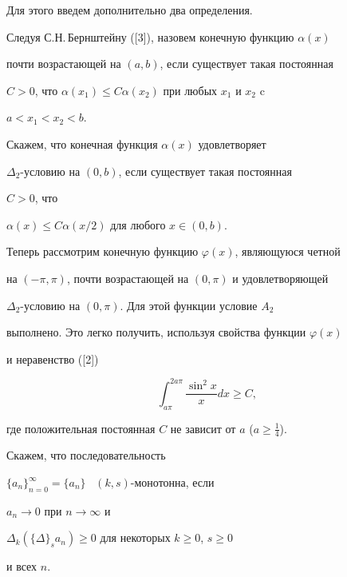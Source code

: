 Для этого введем дополнительно два определения.





Следуя С.Н.\,Бернштейну ([3]), назовем конечную функцию $\alpha(x)$


почти возрастающей на $(a,b)$, если существует такая постоянная


$C{>}0$, что $\alpha(x_1)\leq C\alpha(x_2)$ при любых $x_1$ и $x_2$ c


$a<x_1<x_2<b$.





Скажем, что конечная функция $\alpha (x)$ удовлетворяет


$\Delta_2$-условию на $(0,b)$, если существует такая постоянная


$C>0$, что


$\alpha (x) \leq C \alpha(x/2)$ для любого $x \in (0,b)$.


 


Теперь рассмотрим конечную функцию $\varphi (x)$, являющуюся четной


на $(-\pi,\pi)$, почти возрастающей на $(0,\pi)$ и удовлетворяющей


$\Delta_2$-условию на $(0,\pi)$. Для этой функции условие $A_2$


выполнено. Это легко получить, используя свойства функции $\varphi(x)$


и неравенство ([2])


\begin{equation}


\int_{a\pi}^{2a\pi} \frac{\sin^2x}{x} dx 


\geq C,


\end{equation}


где положительная постоянная $C$ не зависит от $a$ ($a\geq\frac{1}{4}$).





Скажем, что последовательность 


$\{a_n\}_{n=0}^{\infty}= \{a_n\}$ \ $(k,s)$-монотонна, если


$a_n \to 0$ при $n\to \infty$ и


$\Delta_k (\{ \Delta \}_s a_n) \geq 0$ для некоторых $k\geq 0$, $s\geq 0$


и всех $n$.





